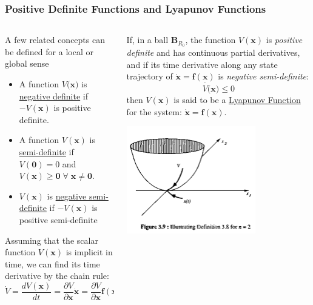 \documentclass[11pt,handout]{beamer}   %
\begin{document}
\begin{frame}
\frametitle{Positive Definite Functions and Lyapunov Functions}
\small
\begin{columns}
\begin{column}{0.5\textwidth}
A few related concepts can be defined for a local or global sense\\
\vspace{6pt}
\begin{itemize}
\item A function $V(\mathbf{x)}$ is \underline{negative definite} if $-V(\mathbf{x})$ is positive definite.
\item A function $V(\mathbf{x})$ is \underline{semi-definite} if $V(\mathbf{0}) = 0$ and $V(\mathbf{x}) \geq \mathbf{0} \; \forall \; \mathbf{x} \neq \mathbf{0}$.
\item $V(\mathbf{x})$ is \underline{negative semi-definite} if $-V(\mathbf{x})$ is positive semi-definite
\end{itemize}
\vspace{0.6pt}
Assuming that the scalar function $V(\mathbf{x})$ is implicit in time, we can find its time derivative by the chain rule:
\begin{equation*}
\dot{V} = \frac{d V(\mathbf{x})}{d t} = \frac{\partial V}{\partial \mathbf{x}} \mathbf{\dot{x}} = \frac{\partial V}{\partial \mathbf{x}} \mathbf{f(x)}
\end{equation*}
\end{column}
\begin{column}{0.5\textwidth}
If, in a ball $\mathbf{B}_{R_0}$, the function $V(\mathbf{x})$ is \textit{positive definite} and has continuous partial derivatives, and if its time derivative along any state trajectory of $\mathbf{\dot{x} = f(x)}$ is \textit{negative semi-definite}:
\begin{equation*}
\dot{V(}\mathbf{x}) \leq 0
\end{equation*}
then $V(\mathbf{x})$ is said to be a \underline{Lyapunov Function} for the system: $\mathbf{\dot{x} = f(x)}$.
\begin{center}
\includegraphics[width = 0.7\textwidth]{Figures/Fig39.PNG}
\end{center}
\end{column}
\end{columns}
\end{frame}
\end{document}
